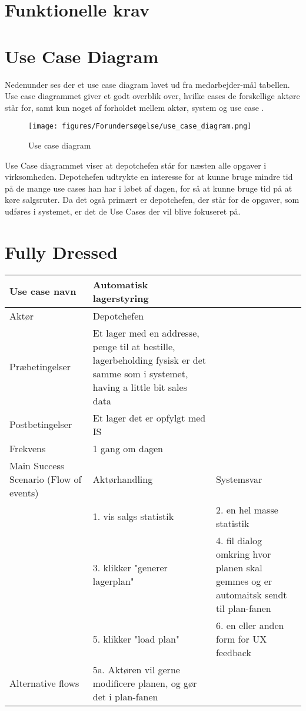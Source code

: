 \section{Funktionelle krav}\label{sec:funktionelle-krav}

\section{Use Case Diagram}
Nedenunder ses der et use case diagram lavet ud fra medarbejder-mål tabellen. Use case diagrammet giver et godt overblik over, hvilke cases de forskellige aktøre står for, samt kun noget af forholdet mellem aktør, system og use case \cite{visual-paradigm.com}. 

\begin{figure}[H]
    \centering
    \texttt{[image: figures/Forundersøgelse/use\_case\_diagram.png]}
    \caption{Use case diagram}
    \label{fig:use_case_diagram}
\end{figure}

Use Case diagrammet viser at depotchefen står for næsten alle opgaver i virksomheden. Depotchefen udtrykte en interesse for at kunne bruge mindre tid på de mange use cases han har i løbet af dagen, for så at kunne bruge tid på at køre salgsruter. Da det også primært er depotchefen, der står for de opgaver, som udføres i systemet, er det de Use Cases der vil blive fokuseret på.

\section{Fully Dressed}
\begin{longtable}{ |p{120pt}|p{120pt}|p{120pt}| }
    \hline
    Use case navn & Automatisk lagerstyring & \\
    \hline
    Aktør & Depotchefen & \\
    \hline
    Præbetingelser & Et lager med en addresse, penge til at bestille, lagerbeholding fysisk er det samme som i systemet, having a little bit sales data & \\
    \hline
    Postbetingelser & Et lager det er opfylgt med IS & \\
    \hline
    Frekvens & 1 gang om dagen & \\
    \hline
    Main Success Scenario (Flow of events) & Aktørhandling & Systemsvar \\
    \hline
    & 1. vis salgs statistik & 2. en hel masse statistik \\
    \hline
    & 3. klikker "generer lagerplan" & 4. fil dialog omkring hvor planen skal gemmes og er automaitsk sendt til plan-fanen \\
    \hline
    & 5. klikker "load plan" & 6. en eller anden form for UX feedback \\
    \hline
    Alternative flows & 5a. Aktøren vil gerne modificere planen, og gør det i plan-fanen \\
    \hline
\end{longtable}

